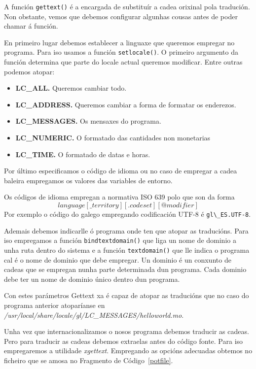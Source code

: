 A función \lstinline{gettext()} é a encargada de substituír a cadea orixinal pola tradución. Non obstante, vemos que debemos configurar algunhas cousas antes de poder chamar á función.

En primeiro lugar debemos establecer a linguaxe que queremos empregar no programa. Para iso usamos a función \lstinline{setlocale()}. O primeiro argumento da función determina que parte do locale actual queremos modificar. Entre outras podemos atopar:

\begin{itemize}
    \item \textbf{LC\_ALL.} Queremos cambiar todo.
    \item \textbf{LC\_ADDRESS.} Queremos cambiar a forma de formatar os enderezos.
    \item \textbf{LC\_MESSAGES.} Os mensaxes do programa.
    \item \textbf{LC\_NUMERIC.} O formatado das cantidades non monetarias
    \item \textbf{LC\_TIME.} O formatado de datas e horas.
\end{itemize}

Por último especificamos o código de idioma ou no caso de empregar a cadea baleira empregamos os valores das variables de entorno.

Os códigos de idioma empregan a normativa ISO 639 polo que son da forma $$language[\_territory][.codeset][@modifier]$$ Por exemplo o código do galego empregando codificación UTF-8 é \lstinline{gl\_ES.UTF-8}.

Ademais debemos indicarlle ó programa onde ten que atopar as traducións. Para iso empregamos a función \lstinline{bindtextdomain()} que liga un nome de dominio a unha ruta dentro do sistema e a función \lstinline{textdomain()} que lle indica o programa cal é o nome de dominio que debe empregar. Un dominio é un conxunto de cadeas que se empregan nunha parte determinada dun programa. Cada dominio debe ter un nome de dominio único dentro dun programa.

Con estes parámetros Gettext xa é capaz de atopar as traducións que no caso do programa anterior atoparíanse en \emph{/usr/local/share/locale/gl/LC\_MESSAGES/helloworld.mo}.

Unha vez que internacionalizamos o nosos programa debemos traducir as cadeas. Pero para traducir as cadeas debemos extraelas antes do código fonte. Para iso empregaremos a utilidade \emph{xgettext}. Empregando as opcións adecuadas obtemos no ficheiro que se amosa no Fragmento de Código~\ref{potfile}.

